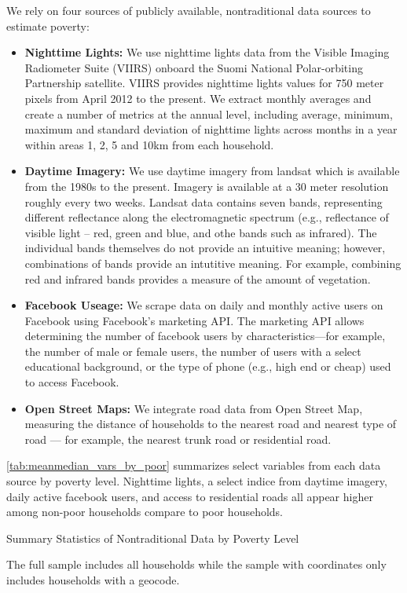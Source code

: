 \documentclass[8pt, oneside]{article}
\begin{document}
We rely on four sources of publicly available, nontraditional data sources to estimate poverty:
\begin{itemize}
\item {\bf Nighttime Lights:} We use nighttime lights data from the Visible Imaging Radiometer Suite (VIIRS) onboard the Suomi National Polar-orbiting Partnership satellite. VIIRS provides nighttime lights values for 750 meter pixels from April 2012 to the present. We extract monthly averages and create a number of metrics at the annual level, including average, minimum, maximum and standard deviation of nighttime lights across months in a year within areas 1, 2, 5 and 10km from each household. 
\item {\bf Daytime Imagery:} We use daytime imagery from landsat which is available from the 1980s to the present. Imagery is available at a 30 meter resolution roughly every two weeks. Landsat data contains seven bands, representing different reflectance along the electromagnetic spectrum (e.g., reflectance of visible light -- red, green and blue, and othe bands such as infrared). The individual bands themselves do not provide an intuitive meaning; however, combinations of bands provide an intutitive meaning. For example, combining red and infrared bands provides a measure of the amount of vegetation.
\item {\bf Facebook Useage:} We scrape data on daily and monthly active users on Facebook using Facebook's marketing API. The marketing API allows determining the number of facebook users by characteristics---for example, the number of male or female users, the number of users with a select educational background, or the type of phone (e.g., high end or cheap) used to access Facebook. 
\item {\bf Open Street Maps:} We integrate road data from Open Street Map, measuring the distance of households to the nearest road and nearest type of road --- for example, the nearest trunk road or residential road.
\end{itemize}

\autoref{tab:meanmedian_vars_by_poor} summarizes select variables from each data source by poverty level. Nighttime lights, a select indice from daytime imagery, daily active facebook users, and access to residential roads all appear higher among non-poor households compare to poor households. 

\begin{table}[H]
\caption{Summary Statistics of Nontraditional Data by Poverty Level}
\label{tab:meanmedian_vars_by_poor}
\centering

\flushleft \footnotesize The full sample includes all households while the sample with coordinates only includes households with a geocode.
\end{table}
\end{document}
